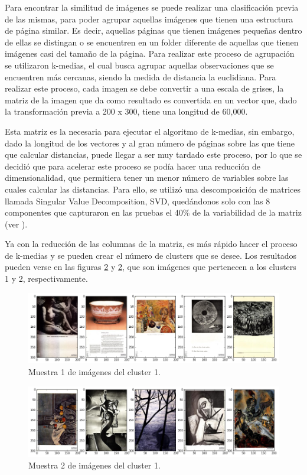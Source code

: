 Para encontrar la similitud de imágenes se puede realizar una clasificación previa de las mismas, para poder agrupar aquellas imágenes que tienen una estructura de página similar. Es decir, aquellas páginas que tienen imágenes pequeñas dentro de ellas se distingan o se encuentren en un folder diferente de aquellas que tienen imágenes casi del tamaño de la página. Para realizar este proceso de agrupación se utilizaron k-medias, el cual busca agrupar aquellas observaciones que se encuentren más cercanas, siendo la medida de distancia la euclidiana.  Para realizar este proceso, cada imagen se debe convertir a una escala de grises, la matriz de la imagen que da como resultado es convertida en un vector que, dado la transformación previa a 200 x 300, tiene una longitud de 60,000. 

Esta matriz es la necesaria para ejecutar el algoritmo de k-medias, sin embargo, dado la longitud de los vectores y al gran número de páginas sobre las que tiene que calcular distancias, puede llegar a ser muy tardado este proceso, por lo que se decidió que para acelerar este proceso se podía hacer una reducción de dimensionalidad, que permitiera tener un menor número de variables sobre las cuales calcular las distancias. Para ello, se utilizó una descomposición de matrices llamada Singular Value Decomposition, SVD, quedándonos solo con las 8 componentes que capturaron en las pruebas el 40\% de la variabilidad de la matriz (ver \cite{leskovec2014mining}).


Ya con la reducción de las columnas de la matriz, es más rápido hacer el proceso de k-medias y se pueden crear el número de clusters que se desee. Los resultados pueden verse en las figuras \ref{fig:cluster2} y \ref{fig:cluster2}, que son imágenes que pertenecen a los clusters 1 y 2, respectivamente.

\begin{figure}[H]
\centering
\includegraphics[width=1\textwidth]{Figures/cluster_1.png}
\caption{Muestra 1 de imágenes del cluster 1.}
\label{fig:cluster1}
\end{figure}

\begin{figure}[H]
\centering
\includegraphics[width=1\textwidth]{Figures/cluster_2.png}
\caption{Muestra 2 de imágenes del cluster 1.}
\label{fig:cluster2}
\end{figure}

